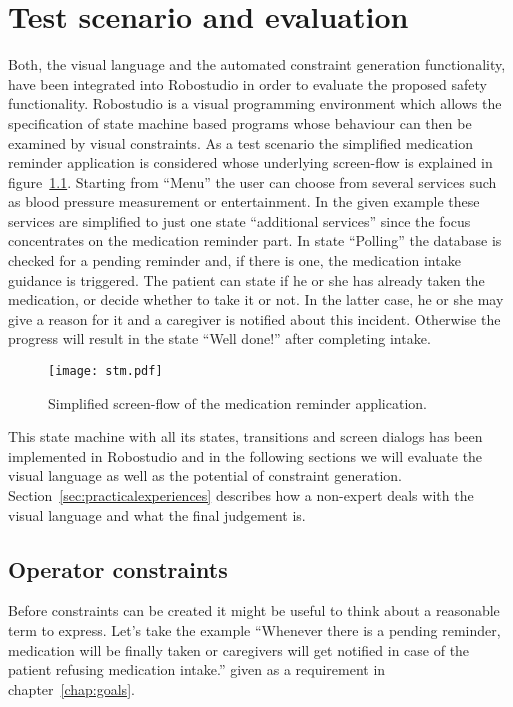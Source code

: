 \chapter{Test scenario and evaluation}
\label{chap:testscenarioandevaluation}

Both, the visual language and the automated constraint generation functionality, have been integrated into Robostudio in order to evaluate the proposed safety functionality. Robostudio is a visual programming environment which allows the specification of state machine based programs whose behaviour can then be examined by visual constraints.
As a test scenario the simplified medication reminder application is considered whose underlying screen-flow is explained in figure~\ref{fig:medicationreminder}. Starting from ``Menu'' the user can choose from several services such as blood pressure measurement or entertainment. In the given example these services are simplified to just one state ``additional services'' since the focus concentrates on the medication reminder part. In state ``Polling'' the database is checked for a pending reminder and, if there is one, the medication intake guidance is triggered. The patient can state if he or she has already taken the medication, or decide whether to take it or not. In the latter case, he or she may give a reason for it and a caregiver is notified about this incident. Otherwise the progress will result in the state ``Well done!'' after completing intake.

\begin{figure}[htbp]
  \centering
  \texttt{[image: stm.pdf]}
  \caption{Simplified screen-flow of the medication reminder application.}
  \label{fig:medicationreminder}
\end{figure}

This state machine with all its states, transitions and screen dialogs has been implemented in Robostudio and in the following sections we will evaluate the visual language as well as the potential of constraint generation. Section~\ref{sec:practicalexperiences} describes how a non-expert deals with the visual language and what the final judgement is.



\section{Operator constraints}

Before constraints can be created it might be useful to think about a reasonable term to express. Let's take the example ``Whenever there is a pending reminder, medication will be finally taken or caregivers will get notified in case of the patient refusing medication intake.'' given as a requirement in chapter~\ref{chap:goals}.

